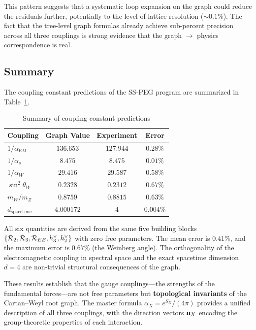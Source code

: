 This pattern suggests that a systematic loop expansion on the graph could reduce the residuals further, potentially to the level of lattice resolution ($\sim 0.1\%$). The fact that the tree-level graph formulas already achieve sub-percent precision across all three couplings is strong evidence that the graph $\to$ physics correspondence is real.

\subsection{Summary}\label{sec:coupling_summary}

The coupling constant predictions of the SS-PEG program are summarized in Table~\ref{tab:coup_summary}.

\begin{table}[h]
\centering
\caption{Summary of coupling constant predictions}
\label{tab:coup_summary}
\begin{tabular}{lccc}
\hline\hline
Coupling & Graph Value & Experiment & Error \\
\hline
$1/\alpha_{\mathrm{EM}}$ & $136.653$ & $127.944$ & $0.28\%$ \\
$1/\alpha_s$ & $8.475$ & $8.475$ & $0.01\%$ \\
$1/\alpha_W$ & $29.416$ & $29.587$ & $0.58\%$ \\
$\sin^2\theta_W$ & $0.2328$ & $0.2312$ & $0.67\%$ \\
$m_W/m_Z$ & $0.8759$ & $0.8815$ & $0.63\%$ \\
$d_{\mathrm{spacetime}}$ & $4.000172$ & $4$ & $0.004\%$ \\
\hline\hline
\end{tabular}
\end{table}

All six quantities are derived from the same five building blocks $\{\mathcal{R}_2, \mathcal{R}_3, \mathcal{R}_{EE}, h^\vee_3, h^\vee_2\}$ with zero free parameters. The mean error is $0.41\%$, and the maximum error is $0.67\%$ (the Weinberg angle). The orthogonality of the electromagnetic coupling in spectral space and the exact spacetime dimension $d = 4$ are non-trivial structural consequences of the graph.

These results establish that the gauge couplings---the strengths of the fundamental forces---are not free parameters but \textbf{topological invariants} of the Cartan--Weyl root graph. The master formula $\alpha_X = e^{S_X}/(4\pi)$ provides a unified description of all three couplings, with the direction vectors $\mathbf{n}_X$ encoding the group-theoretic properties of each interaction.
